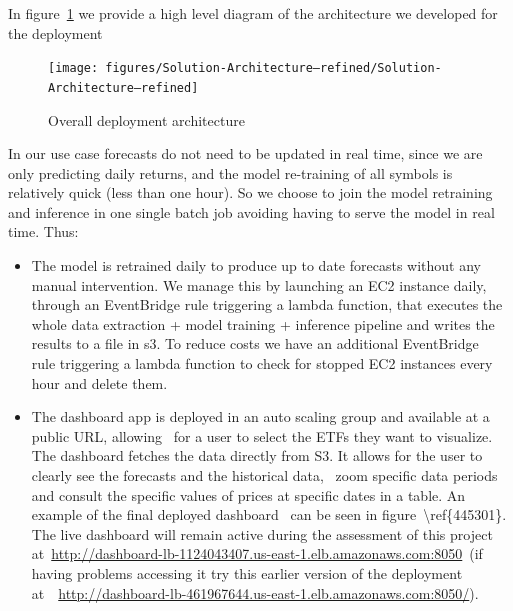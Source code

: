 \documentclass[10pt]{article}
\providecommand{\tightlist}{\setlength{\itemsep}{0pt}\setlength{\parskip}{0pt}}%
\begin{document}
{\label{326741}}

In figure~{\ref{178032}} we provide a high level
diagram of the architecture we developed for the deployment
\begin{figure}[H]
\begin{center}
\texttt{[image: figures/Solution-Architecture---refined/Solution-Architecture---refined]}
\caption{{Overall deployment architecture
{\label{178032}}%
}}
\end{center}
\end{figure}

In our use case forecasts do not need to be updated in real time, since
we are only predicting daily returns, and the model re-training of all
symbols is relatively quick (less than one hour). So we choose to join
the model retraining and inference in one single batch job avoiding
having to serve the model in real time. Thus:

\begin{itemize}
\tightlist
\item
  The model is retrained daily to produce up to date forecasts without
  any manual intervention. We manage this by launching an EC2 instance
  daily, through an EventBridge rule triggering a lambda function, that
  executes the whole data extraction + model training + inference
  pipeline and writes the results to a file in s3. To reduce costs we
  have an additional EventBridge~ rule triggering a lambda function to
  check for stopped EC2 instances every hour and delete them.
\item
  The dashboard app is deployed in an auto scaling group and available
  at a public URL, allowing~ for a user to select the ETFs they want to
  visualize. The dashboard fetches the data directly from S3. It allows
  for the user to clearly see the forecasts and the historical data,~
  zoom specific data periods and consult the specific values of prices
  at specific dates in a table. An example of the final deployed
  dashboard~ can be seen in figure~{\textbackslash ref\{445301\}}. The
  live dashboard will remain active during the assessment of this
  project
  at~\url{http://dashboard-lb-1124043407.us-east-1.elb.amazonaws.com:8050}~(if
  having problems accessing it try this earlier version of the
  deployment~
  at~~\url{http://dashboard-lb-461967644.us-east-1.elb.amazonaws.com:8050/}).
\end{itemize}
\end{document}
